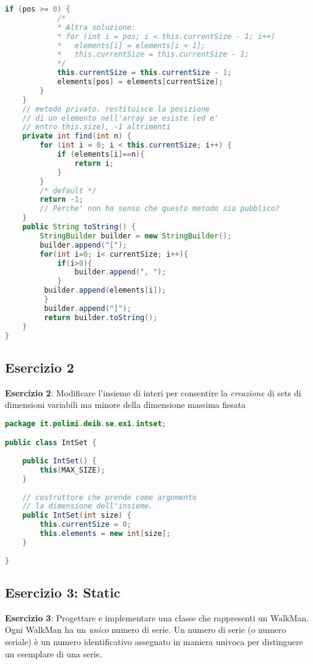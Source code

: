 \documentclass{article}
\begin{document}
\begin{lstlisting}[language=Java,escapechar=|]
    	if (pos >= 0) {
    	    /*
    	    * Altra soluzione:
    	    * for (int i = pos; i < this.currentSize - 1; i++)
    	    *	elements[i] = elements[i + 1];
    	    *	this.currentSize = this.currentSize - 1;
    	    */						
    	    this.currentSize = this.currentSize - 1;
    	    elements[pos] = elements[currentSize];
    	}
    }
    // metodo privato. restituisce la posizione
    // di un elemento nell'array se esiste (ed e'
    // entro this.size), -1 altrimenti
    private int find(int n) {
        for (int i = 0; i < this.currentSize; i++) {
            if (elements[i]==n){
                return i;
            }
        }
        /* default */
        return -1;
        // Perche' non ha senso che questo metodo sia pubblico?
    }
    public String toString() {
        StringBuilder builder = new StringBuilder();
        builder.append("[");
        for(int i=0; i< currentSize; i++){
            if(i>0){
                builder.append(", ");
            }
         builder.append(elements[i]);
         }
         builder.append("]");
         return builder.toString();
    }
}
\end{lstlisting}

\subsection{Esercizio 2}

\begin{framed}
\textbf{Esercizio 2}: Modificare l'insieme di interi per consentire la \emph{creazione} di sets di dimensioni variabili ma minore della dimensione massima fissata
\end{framed}


\begin{lstlisting}[language=Java,escapechar=|]
package it.polimi.deib.se.ex1.intset;

public class IntSet {
	
	public IntSet() {
		this(MAX_SIZE);
	}
	
	// costruttore che prende come argomento
	// la dimensione dell'insieme.
	public IntSet(int size) {
		this.currentSize = 0;
		this.elements = new int[size];
	}
	
}
\end{lstlisting}



\subsection{Esercizio 3: Static}
\begin{framed}
\textbf{Esercizio 3}: Progettare e implementare una classe che rappresenti un WalkMan. Ogni WalkMan ha un \emph{unico} numero di serie. Un numero di serie (o numero seriale) è un numero identificativo assegnato in maniera univoca per distinguere un esemplare di una serie.
\end{framed}
\end{document}
